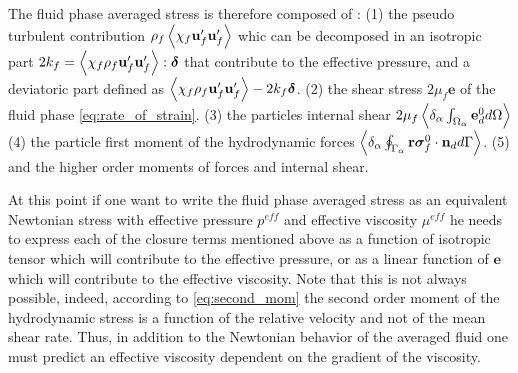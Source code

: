 The fluid phase averaged stress is therefore composed of : 
(1) the pseudo turbulent contribution $\rho_f\left<\chi_f  \textbf{u}_f' \textbf{u}_f'\right>$ whic can be decomposed in an isotropic part $2 k_f = \left<\chi_f \rho_f \textbf{u}_f' \textbf{u}_f'\right>:\bm\delta$ that contribute to the effective pressure, and a deviatoric part defined as $\left<\chi_f \rho_f \textbf{u}_f' \textbf{u}_f'\right> - 2 k_f\bm\delta$. 
(2) the shear stress $2\mu_f \textbf{e}$ of the fluid phase \ref{eq:rate_of_strain}. 
(3) the particles internal shear $2\mu_f \left<\delta_\alpha \int_{\Omega_\alpha} \textbf{e}_d^0 d\Omega\right>$
(4) the particle first moment of the hydrodynamic forces $\left<\delta_\alpha \oint_{\Gamma_\alpha} \textbf{r}\bm{\sigma}_f^0\cdot \textbf{n}_d d\Gamma\right>$. 
(5) and the higher order moments of forces and internal shear.  

At this point if one want to write the fluid phase averaged stress as an equivalent Newtonian stress with effective pressure $p^{eff}$ and effective viscosity $\mu^{eff}$ he needs to express each of the closure terms mentioned above as a function of isotropic tensor which will contribute to the effective pressure, or as a linear function of  $\textbf{e}$ which will contribute to the effective viscosity. 
Note that this is not always possible, indeed, according to \ref{eq:second_mom} the second order moment of the hydrodynamic stress is a function of the relative velocity and not of the mean shear rate. 
Thus, in addition to the Newtonian behavior of the averaged fluid one must predict an effective viscosity dependent on the gradient of the viscosity. 


